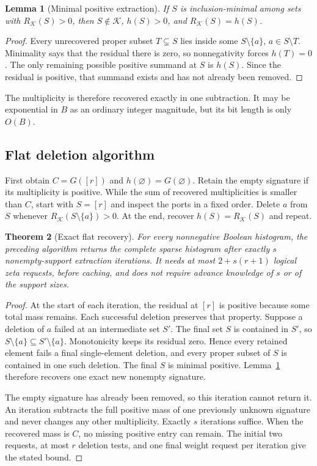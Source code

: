 \documentclass[11pt,letterpaper]{article}
\newtheorem{theorem}{Theorem}[section]
\newtheorem{lemma}[theorem]{Lemma}
\begin{document}
\begin{lemma}[Minimal positive extraction]
\label{lem:minimal}
If $S$ is inclusion-minimal among sets with $R_{\mathcal K}(S)>0$, then
$S\notin\mathcal K$, $h(S)>0$, and $R_{\mathcal K}(S)=h(S)$.
\end{lemma}
\begin{proof}
Every unrecovered proper subset $T\subsetneq S$ lies inside some
$S\setminus\{a\}$, $a\in S\setminus T$. Minimality says that the residual
there is zero, so nonnegativity forces $h(T)=0$. The only remaining possible
positive summand at $S$ is $h(S)$. Since the residual is positive, that summand
exists and has not already been removed.
\end{proof}

The multiplicity is therefore recovered exactly in one subtraction. It may
be exponential in $B$ as an ordinary integer magnitude, but its bit length is
only $O(B)$.

\subsection{Flat deletion algorithm}
First obtain $C=G([r])$ and $h(\varnothing)=G(\varnothing)$. Retain the empty
signature if its multiplicity is positive. While the sum of recovered
multiplicities is smaller than $C$, start with $S=[r]$ and inspect the ports
in a fixed order. Delete $a$ from $S$ whenever
$R_{\mathcal K}(S\setminus\{a\})>0$. At the end, recover
$h(S)=R_{\mathcal K}(S)$ and repeat.

\begin{theorem}[Exact flat recovery]
\label{thm:flat}
For every nonnegative Boolean histogram, the preceding algorithm returns the
complete sparse histogram after exactly $s$ nonempty-support extraction
iterations. It needs at most $2+s(r+1)$ logical zeta requests, before caching,
and does not require advance knowledge of $s$ or of the support sizes.
\end{theorem}
\begin{proof}
At the start of each iteration, the residual at $[r]$ is positive because
some total mass remains. Each successful deletion preserves that property.
Suppose a deletion of $a$ failed at an intermediate set $S'$. The final set
$S$ is contained in $S'$, so
$S\setminus\{a\}\subseteq S'\setminus\{a\}$. Monotonicity keeps its
residual zero. Hence every retained element fails a final single-element
deletion, and every proper subset of $S$ is contained in one such deletion.
The final $S$ is minimal positive. Lemma~\ref{lem:minimal} therefore recovers
one exact new nonempty signature.

The empty signature has already been removed, so this iteration cannot
return it. An iteration subtracts the full positive mass of one previously
unknown signature and never changes any other multiplicity. Exactly $s$
iterations suffice. When the recovered mass is $C$, no missing positive
entry can remain. The initial two requests, at most $r$ deletion tests, and
one final weight request per iteration give the stated bound.
\end{proof}
\end{document}
